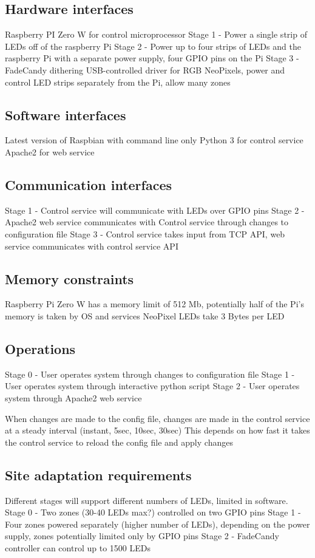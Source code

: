 \documentclass[onecolumn, draftclsnofoot,10pt, compsoc]{IEEEtran}
\begin{document}
			\subsection*{Hardware interfaces}
			Raspberry PI Zero W for control microprocessor
			Stage 1 - Power a single strip of LEDs off of the raspberry Pi
			Stage 2 - Power up to four strips of LEDs and the raspberry Pi with a separate power supply, four GPIO pins on the Pi
			Stage 3 - FadeCandy dithering USB-controlled driver for RGB NeoPixels, power and control LED strips separately from the Pi, allow many zones


			\subsection*{Software interfaces}
			Latest version of Raspbian with command line only
			Python 3 for control service
			Apache2 for web service


			\subsection*{Communication interfaces}
			Stage 1 - Control service will communicate with LEDs over GPIO pins
			Stage 2 - Apache2 web service communicates with Control service through changes to configuration file
			Stage 3 - Control service takes input from TCP API, web service communicates with control service API

			\subsection*{Memory constraints}
			Raspberry Pi Zero W has a memory limit of 512 Mb, potentially half of the Pi's memory is taken by OS and services
			NeoPixel LEDs take 3 Bytes per LED


			\subsection*{Operations}
			Stage 0 - User operates system through changes to configuration file
			Stage 1 - User operates system through interactive python script
			Stage 2 - User operates system through Apache2 web service

			When changes are made to the config file, changes are made in the control service at a steady interval (instant, 5sec, 10sec, 30sec)
			This depends on how fast it takes the control service to reload the config file and apply changes

			\subsection*{Site adaptation requirements}
			Different stages will support different numbers of LEDs, limited in software.
			Stage 0 - Two zones (30-40 LEDs max?) controlled on two GPIO pins
			Stage 1 - Four zones powered separately (higher number of LEDs), depending on the power supply, zones potentially limited only by GPIO pins
			Stage 2 - FadeCandy controller can control up to 1500 LEDs
\end{document}

